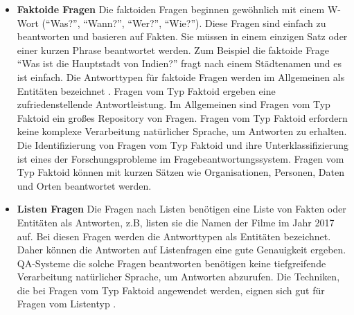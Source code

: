 \documentclass[
        ngerman,
        paper=a4,
        numbers=noendperiod,
]{scrreprt}
\begin{document}
\begin{itemize}
    \item \textbf{Faktoide Fragen} 
    Die faktoiden Fragen beginnen gewöhnlich mit einem W-Wort (\enquote{Was?}, \enquote{Wann?}, \enquote{Wer?}, \enquote{Wie?}). Diese Fragen sind einfach zu beantworten und basieren auf Fakten. Sie müssen in einem einzigen Satz oder einer kurzen Phrase beantwortet werden. Zum Beispiel die faktoide Frage \enquote{Was ist die Hauptstadt von Indien?} fragt nach einem Städtenamen und es ist einfach. Die Antworttypen für faktoide Fragen werden im Allgemeinen als Entitäten bezeichnet \citep{khillare2014comparative}. Fragen vom Typ Faktoid ergeben eine zufriedenstellende Antwortleistung. Im Allgemeinen sind Fragen vom Typ Faktoid ein großes Repository von Fragen. Fragen vom Typ Faktoid erfordern keine komplexe Verarbeitung natürlicher Sprache, um Antworten zu erhalten. Die Identifizierung von Fragen vom Typ Faktoid und ihre Unterklassifizierung ist eines der Forschungsprobleme im Fragebeantwortungssystem. Fragen vom Typ Faktoid können mit kurzen Sätzen wie Organisationen, Personen, Daten und Orten beantwortet werden.
    \item \textbf{Listen Fragen}
    Die Fragen nach Listen benötigen eine Liste von Fakten oder Entitäten als Antworten, z.B, listen sie die Namen der Filme im Jahr 2017 auf. Bei diesen Fragen werden die Antworttypen als Entitäten bezeichnet. Daher können die Antworten auf Listenfragen eine gute Genauigkeit ergeben. QA-Systeme die solche Fragen beantworten benötigen keine tiefgreifende Verarbeitung natürlicher Sprache, um Antworten abzurufen. Die Techniken, die bei Fragen vom Typ Faktoid angewendet werden, eignen sich gut für Fragen vom Listentyp \citep{wu2015leveraging}.
    

\end{itemize}
\end{document}
